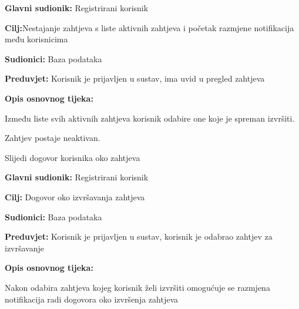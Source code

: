 \noindent {}
\begin{packed_item}
	\item \textbf{Glavni sudionik: }Registrirani korisnik
	\item  \textbf{Cilj:}Nestajanje zahtjeva s liste aktivnih zahtjeva i početak razmjene notifikacija među korisnicima 
	\item  \textbf{Sudionici:} Baza podataka
	\item  \textbf{Preduvjet:} Korisnik je prijavljen u sustav, ima uvid u pregled zahtjeva
	\item  \textbf{Opis osnovnog tijeka:}
	\item[] \begin{packed_enum}
		\item Između liste svih aktivnih zahtjeva korisnik odabire one koje je spreman izvršiti.
		\item Zahtjev postaje neaktivan.
		\item 	Slijedi dogovor korisnika oko zahtjeva
	\end{packed_enum}
\end{packed_item}
\newpage
\noindent {}
\begin{packed_item}
	\item \textbf{Glavni sudionik: } Registrirani korisnik
	\item  \textbf{Cilj:} Dogovor oko izvršavanja zahtjeva
	\item  \textbf{Sudionici:} Baza podataka
	\item  \textbf{Preduvjet:} Korisnik je prijavljen u sustav, korisnik je odabrao zahtjev za izvršavanje
	\item  \textbf{Opis osnovnog tijeka:}
	\item[] \begin{packed_enum}
		\item Nakon odabira zahtjeva kojeg korisnik želi izvršiti omogućuje se razmjena notifikacija radi dogovora oko izvršenja zahtjeva 
	\end{packed_enum}
\end{packed_item}

